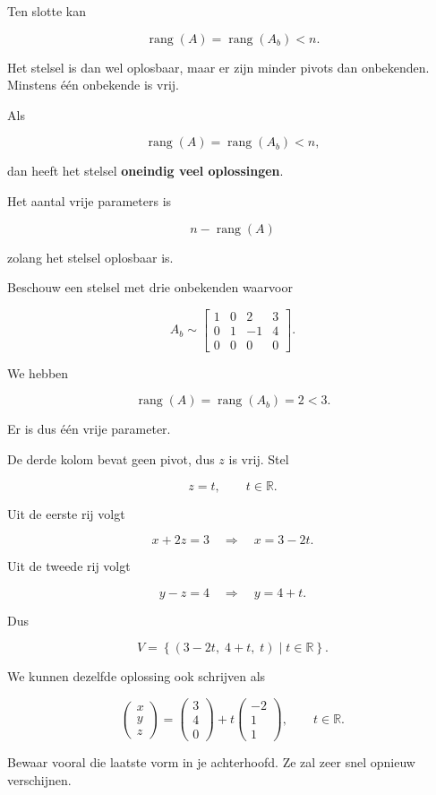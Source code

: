 \documentclass{ximera}
\begin{document}

Ten slotte kan

\[
\operatorname{rang}(A)
=
\operatorname{rang}(A_b)
<
n.
\]

Het stelsel is dan wel oplosbaar, maar er zijn minder pivots dan onbekenden.
Minstens één onbekende is vrij.

\begin{eigenschap}
Als

\[
\operatorname{rang}(A)
=
\operatorname{rang}(A_b)
<
n,
\]

dan heeft het stelsel \textbf{oneindig veel oplossingen}.
\end{eigenschap}


Het aantal vrije parameters is

\[
\boxed{
n-\operatorname{rang}(A)
}
\]

zolang het stelsel oplosbaar is.


\begin{voorbeeld}

Beschouw een stelsel met drie onbekenden waarvoor

\[
A_b\sim
\left[
\begin{array}{ccc|c}
1&0&2&3\\
0&1&-1&4\\
0&0&0&0
\end{array}
\right].
\]

We hebben

\[
\operatorname{rang}(A)
=
\operatorname{rang}(A_b)
=
2<3.
\]

Er is dus één vrije parameter.

De derde kolom bevat geen pivot, dus \(z\) is vrij.
Stel

\[
z=t,
\qquad t\in\mathbb{R}.
\]

Uit de eerste rij volgt

\[
x+2z=3
\quad\Longrightarrow\quad
x=3-2t.
\]

Uit de tweede rij volgt

\[
y-z=4
\quad\Longrightarrow\quad
y=4+t.
\]

Dus

\[
V=
\left\{
(3-2t,\;4+t,\;t)
\mid t\in\mathbb{R}
\right\}.
\]

We kunnen dezelfde oplossing ook schrijven als

\[
\begin{pmatrix}
x\\y\\z
\end{pmatrix}
=
\begin{pmatrix}
3\\4\\0
\end{pmatrix}
+
t
\begin{pmatrix}
-2\\1\\1
\end{pmatrix},
\qquad t\in\mathbb{R}.
\]

Bewaar vooral die laatste vorm in je achterhoofd.
Ze zal zeer snel opnieuw verschijnen.
\end{voorbeeld}
\end{document}
